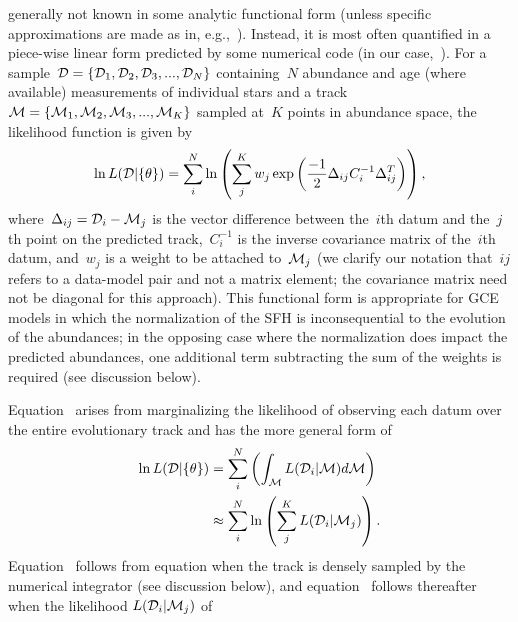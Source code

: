 \documentclass[ms.tex]{subfiles}
\begin{document}
generally not known in some analytic functional form (unless specific
approximations are made as in, e.g.,~\citealp{Weinberg2017}).
Instead, it is most often quantified in a piece-wise linear form predicted by
some numerical code (in our case,~\vice).
For a sample~$\mathcal{D} = \{\mathcal{D}_1, \mathcal{D}_2, \mathcal{D}_3, ...,
\mathcal{D}_N\}$ containing~$N$ abundance and age (where available) measurements
of individual stars and a track~$\mathcal{M} = \{\mathcal{M}_1, \mathcal{M}_2,
\mathcal{M}_3, ..., \mathcal{M}_K\}$ sampled at~$K$ points in abundance space,
the likelihood function is given by
\begin{equation}
\ln L(\mathcal{D} | \{\theta\}) = \sum_i^N \ln \left(
\sum_j^K w_j \exp\left(
\frac{-1}{2}\Delta_{ij}C_i^{-1}\Delta_{ij}^T
\right)
\right),
\label{eq:likelihood}
\end{equation}
where~$\Delta_{ij} = \mathcal{D}_i - \mathcal{M}_j$ is the vector difference
between the~$i$th datum and the~$j$th point on the predicted track,~$C_i^{-1}$
is the inverse covariance matrix of the~$i$th datum, and~$w_j$ is a weight to
be attached to~$\mathcal{M}_j$ (we clarify our notation that~$ij$ refers to a
data-model pair and not a matrix element; the covariance matrix need not be
diagonal for this approach).
This functional form is appropriate for GCE models in which the normalization
of the SFH is inconsequential to the evolution of the abundances; in the
opposing case where the normalization does impact the predicted abundances,
one additional term subtracting the sum of the weights is required (see
discussion below).
\par
Equation~ arises from marginalizing the likelihood of
observing each datum over the entire evolutionary track and has the more
general form of
\begin{subequations}\begin{align}
\ln L(\mathcal{D} | \{\theta\}) &= \sum_i^N \left(
\int_{\mathcal{M}} L(\mathcal{D}_i | \mathcal{M}) d\mathcal{M}
\right)
\label{eq:likelihood_general_int}
\\
&\approx \sum_i^N \ln \left(
\sum_j^K L(\mathcal{D}_i | \mathcal{M}_j)\right).
\label{eq:likelihood_general}
\end{align}\end{subequations}
Equation~ follows from equation
 when the track is densely sampled by the
numerical integrator (see discussion below), and equation~
follows thereafter when the likelihood $L(\mathcal{D}_i | \mathcal{M}_j)$ of
\end{document}
